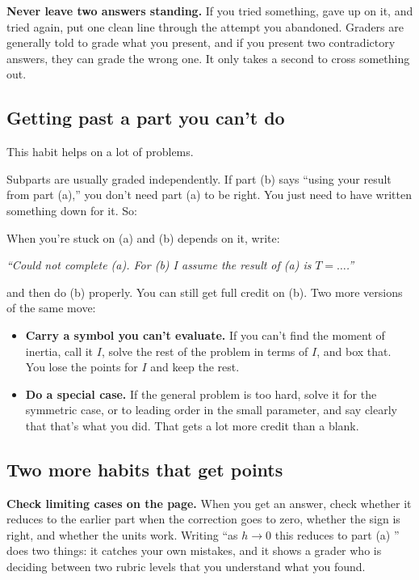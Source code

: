 \documentclass[11pt]{article}
\begin{document}
\begin{tipbox}
\textbf{Never leave two answers standing.} If you tried something, gave up on it, and tried
again, put one clean line through the attempt you abandoned. Graders are generally told to
grade what you present, and if you present two contradictory answers, they can grade the
wrong one. It only takes a second to cross something out.
\end{tipbox}

\subsection*{Getting past a part you can't do}

This habit helps on a lot of problems.

Subparts are usually graded independently. If part (b) says ``using your result from part
(a),'' you don't need part (a) to be right. You just need to have written something down for
it. So:

\begin{keybox}
When you're stuck on (a) and (b) depends on it, write:
\begin{center}
\emph{``Could not complete (a). For (b) I assume the result of (a) is} $T = \ldots$\emph{.''}
\end{center}
and then do (b) properly. You can still get full credit on (b). Two more versions of the
same move:
\begin{itemize}\setlength{\itemsep}{2pt}
\item \textbf{Carry a symbol you can't evaluate.} If you can't find the moment of inertia,
call it $I$, solve the rest of the problem in terms of $I$, and box that. You lose the points
for $I$ and keep the rest.
\item \textbf{Do a special case.} If the general problem is too hard, solve it for the
symmetric case, or to leading order in the small parameter, and say clearly that that's what
you did. That gets a lot more credit than a blank.
\end{itemize}
\end{keybox}

\subsection*{Two more habits that get points}

\textbf{Check limiting cases on the page.} When you get an answer, check whether it reduces
to the earlier part when the correction goes to zero, whether the sign is right, and whether
the units work. Writing ``as $h \to 0$ this reduces to part (a) \checkmark'' does two
things: it catches your own mistakes, and it shows a grader who is deciding between two
rubric levels that you understand what you found.
\end{document}
